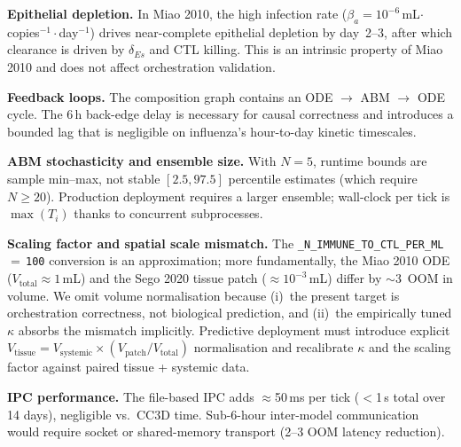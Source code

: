 \documentclass[conference,letterpaper,10pt]{IEEEtran}
\begin{document}
\textbf{Epithelial depletion.} In Miao 2010, the high infection rate
($\beta_a\!=\!10^{-6}$\,mL$\cdot$copies$^{-1}\cdot$day$^{-1}$) drives
near-complete epithelial depletion by day~2--3, after which clearance
is driven by $\delta_{Es}$ and CTL killing. This is an intrinsic
property of Miao 2010 and does not affect orchestration validation.

\textbf{Feedback loops.} The composition graph contains an ODE $\to$
ABM $\to$ ODE cycle. The 6\,h back-edge delay is necessary for causal
correctness and introduces a bounded lag that is negligible on
influenza's hour-to-day kinetic timescales.

\textbf{ABM stochasticity and ensemble size.} With $N\!=\!5$, runtime
bounds are sample min--max, not stable $[2.5, 97.5]$ percentile
estimates (which require $N\!\geq\!20$). Production deployment requires
a larger ensemble; wall-clock per tick is $\max(T_i)$ thanks to
concurrent subprocesses.

\textbf{Scaling factor and spatial scale mismatch.} The
\texttt{\_N\_IMMUNE\_TO\_CTL\_PER\_ML\,$=\,$100} conversion is an
approximation; more fundamentally, the Miao 2010 ODE
($V_{\text{total}}\!\approx\!1$\,mL) and the Sego 2020 tissue patch
($\approx\!10^{-3}$\,mL) differ by $\sim$3~OOM in volume. We omit
volume normalisation because (i)~the present target is orchestration
correctness, not biological prediction, and (ii)~the empirically tuned
$\kappa$ absorbs the mismatch implicitly. Predictive deployment must
introduce explicit $V_{\text{tissue}}\!=\!V_{\text{systemic}}\times
(V_{\text{patch}}/V_{\text{total}})$ normalisation and recalibrate
$\kappa$ and the scaling factor against paired tissue + systemic data.

\textbf{IPC performance.} The file-based IPC adds $\approx$50\,ms per
tick ($<$1\,s total over 14 days), negligible vs.\ CC3D time.
Sub-6-hour inter-model communication would require socket or
shared-memory transport (2--3 OOM latency reduction).

\end{document}
